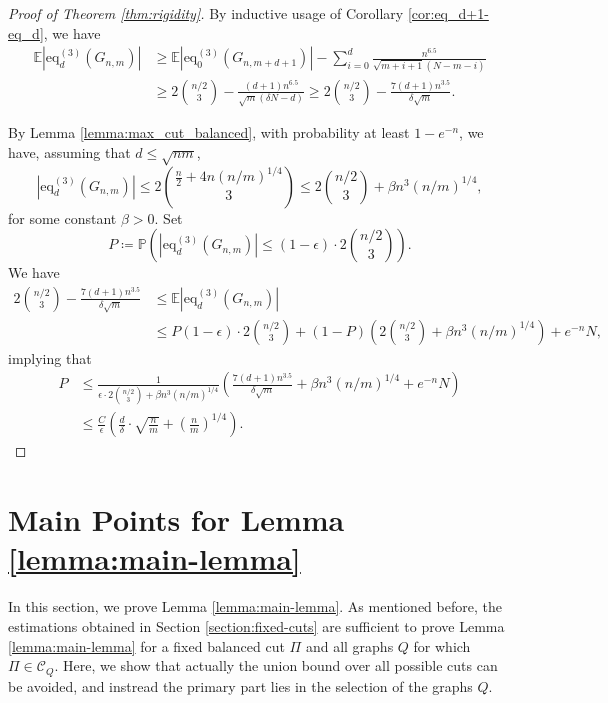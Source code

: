 \documentclass[11pt,a4paper,oneside,reqno]{amsart}
\newcommand{\Gnp}{G_{n, p}^{(3)}}
\newcommand{\cC}{\mathcal{C}}
\renewcommand{\Pr}{\mathbb{P}}
\newcommand{\Ex}{\mathbb{E}}
\newcommand{\1}{\mathbbm{1}} %
\renewcommand{\le}{\leqslant}
\renewcommand{\ge}{\geqslant}
\newcommand{\eq}{\mathrm{eq}}
\begin{document}
\begin{proof}[Proof of Theorem \ref{thm:rigidity}]
By inductive usage of Corollary \ref{cor:eq_d+1-eq_d}, we have
\begin{align*}
    \Ex\left|\eq_{d}^{(3)}(G_{n, m})\right| &\ge \Ex\left|\eq_{0}^{(3)}(G_{n, m+d+1})\right| - \sum_{i=0}^{d} \frac{n^{6.5}}{\sqrt{m+i+1}\left(N-m-i\right)} \\
    &\ge 2 \binom{n/2}{3} - \frac{(d+1) n^{6.5}}{\sqrt{m}\left(\delta N - d\right)} \ge 2 \binom{n/2}{3} - \frac{7(d+1)n^{3.5}}{\delta \sqrt{m}}.
\end{align*}

By Lemma \ref{lemma:max_cut_balanced}, with probability at least $1-e^{-n}$, we have, assuming that $d \le \sqrt{nm}$,
\[
    \left|\eq_{d}^{(3)}(G_{n, m})\right| \le 2\binom{\frac{n}{2} + 4 n (n/m)^{1/4}}{3} \le 2\binom{n/2}{3} + \beta n^3 (n/m)^{1/4},
\]
for some constant $\beta > 0$. Set 
\[
    P \coloneqq \Pr\left(\left|\eq_d^{(3)}(G_{n, m})\right| \le (1-\epsilon) \cdot 2 \binom{n/2}{3}\right).
\]
We have
\begin{align*}
    2 \binom{n/2}{3} - \frac{7(d+1)n^{3.5}}{\delta \sqrt{m}} &\le \Ex\left|\eq_{d}^{(3)}(G_{n, m})\right| \\&\le P(1-\epsilon) \cdot 2 \binom{n/2}{3} + (1-P)\left(2\binom{n/2}{3} + \beta n^3 (n/m)^{1/4}\right) + e^{-n} N,
\end{align*}
implying that
\begin{align*}
    P &\le \frac{1}{\epsilon \cdot 2\binom{n/2}{3} + \beta n^3 (n/m)^{1/4}} \left(\frac{7(d+1)n^{3.5}}{\delta \sqrt{m}} + \beta n^3 (n/m)^{1/4} + e^{-n} N\right) \\
    &\le \frac{C}{\epsilon}\left(\frac{d}{\delta} \cdot \sqrt{\frac{n}{m}} + \left(\frac{n}{m}\right)^{1/4}\right).
\end{align*}

\end{proof}

\section{Main Points for Lemma \ref{lemma:main-lemma}}
In this section, we prove Lemma \ref{lemma:main-lemma}. As mentioned before, the estimations obtained in Section \ref{section:fixed-cuts} are sufficient to prove Lemma \ref{lemma:main-lemma} for a fixed balanced cut $\Pi$ and all graphs $Q$ for which $\Pi \in \cC_Q$. Here, we show that actually the union bound over all possible cuts can be avoided, and instread the primary part lies in the selection of the graphs $Q$.
\end{document}
